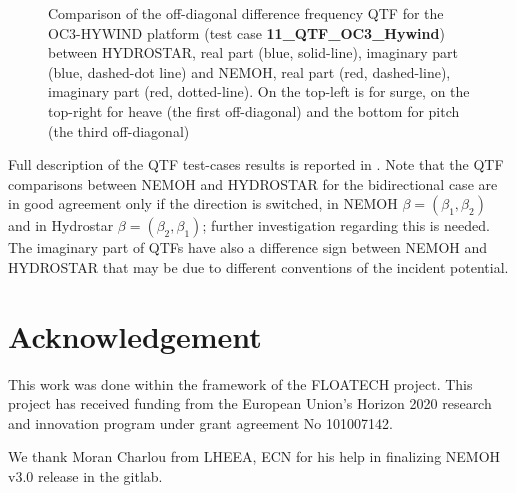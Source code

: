 \documentclass[12pt,a4paper,titlepage]{article}
\begin{document}
\begin{figure}[ht!]
{}
	\caption{Comparison of the off-diagonal difference frequency QTF for the OC3-HYWIND platform (test case \textbf{11\_QTF\_OC3\_Hywind}) between HYDROSTAR, real part (blue, solid-line), imaginary part (blue, dashed-dot line) and NEMOH, real part (red, dashed-line), imaginary part (red, dotted-line). On the top-left is for surge, on the top-right for heave (the first off-diagonal) and the bottom for pitch (the third off-diagonal)}\label{fig:QTFM_diag_OC3_HYWIND}
\end{figure}

Full description of the QTF test-cases results is reported in \citep{Kurnia22_JH,Kurnia22}. Note that the QTF comparisons between NEMOH and HYDROSTAR for the bidirectional case are in good agreement only if the direction is switched, in NEMOH $\beta=(\beta_1,\beta_2)$ and in Hydrostar $\beta=(\beta_2,\beta_1)$; further investigation regarding this is needed. The imaginary part of QTFs have also a difference sign between NEMOH and HYDROSTAR that may be due to different conventions of the incident potential.

\FloatBarrier

\section*{Acknowledgement}
This work was done within the framework of the FLOATECH project. This project has received funding from the European Union’s Horizon 2020 research and innovation program under grant agreement No 101007142.

We thank Moran Charlou from LHEEA, ECN for his help in finalizing NEMOH v3.0 release in the gitlab.




\end{document}
